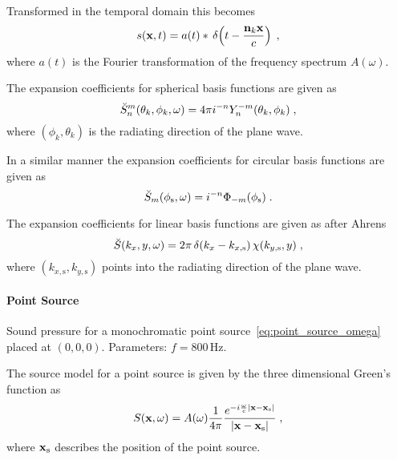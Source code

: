 Transformed in the temporal domain this becomes
%
\begin{equation}
    s(\x,t) = a(t) * \deltafunc{t -\frac{\n_k \x}{c}}
    \qc
    \label{eq:plane_wave_t}
\end{equation}
where $a(t)$ is the Fourier transformation of the frequency spectrum $A(\omega)$.

The expansion coefficients for spherical basis functions are given
as
%
\begin{equation}
    \breve{S}_n^m(\theta_k,\phi_k,\omega) = 4\pi i^{-n} Y_n^{-m}(\theta_k,\phi_k)
    \qc
    \label{eq:plane_wave_spherical}
\end{equation}
%
where $(\phi_k,\theta_k)$ is the radiating direction of the plane wave.

In a similar manner the expansion coefficients for circular basis functions are
given as
%
\begin{equation}
    \breve{S}_m(\phi_\text{s},\omega) = i^{-n} \Phi_{-m}(\phi_\text{s}) \qp
    \label{eq:plane_wave_circular}
\end{equation}
%

The expansion coefficients for linear basis functions are
given as after Ahrens
%
\begin{equation}
    \breve{S}(k_x,y,\omega) = 2\pi \deltafunc{k_x-k_{x,\text{s}}}
    \chi(k_{y,\text{s}},y)
    \qc
    \label{eq:plane_wave_linear}
\end{equation}
%
where $(k_{x,\text{s}},k_{y,\text{s}})$ points into the radiating direction of
the plane wave.


\paragraph{Point Source}
\label{sec:point_source}
%
\begin{marginfigure}
    \centering
    \ft
    
    \caption{Sound pressure for a monochromatic point
        source~\eqref{eq:point_source_omega} placed at $(0,0,0)$. Parameters: $f =
        800$\,Hz.
        }
\end{marginfigure}
%
The source model for a point source is given by the three dimensional Green's
function as
%
\begin{equation}
    S(\x,\omega) = A(\omega) \frac{1}{4\pi}
    \frac{e^{-i\omegac|\x-\xs|}}{|\x-\xs|}
    \qc
    \label{eq:point_source_omega}
\end{equation}
%
where $\mathbf{x}_\text{s}$ describes the position of the point source.

